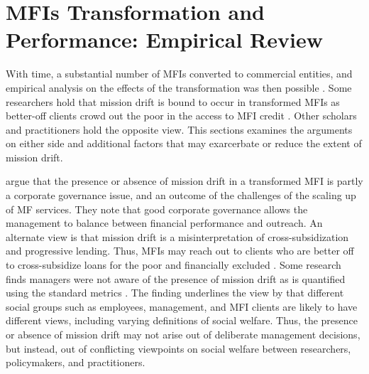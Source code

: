 \documentclass[a4paper, nobind]{templates/ociamthesis}
\begin{document}
\hypertarget{mfis-transformation-and-performance-empirical-review}{%
\section{MFIs Transformation and Performance: Empirical Review}\label{mfis-transformation-and-performance-empirical-review}}

\noindent With time, a substantial number of MFIs converted to commercial entities, and empirical analysis on the effects of the transformation was then possible \autocite{abeysekera2014sustainability,mia2017mission,d2017ngos}. Some researchers hold that mission drift is bound to occur in transformed MFIs as better-off clients crowd out the poor in the access to MFI credit \autocite{hishigsuren2006transformation}. Other scholars and practitioners hold the opposite view. This sections examines the arguments on either side and additional factors that may exarcerbate or reduce the extent of mission drift.

\textcite{campion1999institutional} argue that the presence or absence of mission drift in a transformed MFI is partly a corporate governance issue, and an outcome of the challenges of the scaling up of MF services. They note that good corporate governance allows the management to balance between financial performance and outreach. An alternate view is that mission drift is a misinterpretation of cross-subsidization and progressive lending. Thus, MFIs may reach out to clients who are better off to cross-subsidize loans for the poor and financially excluded \autocite{abeysekera2014sustainability}. Some research finds managers were not aware of the presence of mission drift as is quantified using the standard metrics \autocite{hishigsuren2007evaluating}. The finding underlines the view by \autocite{marti2016financial} that different social groups such as employees, management, and MFI clients are likely to have different views, including varying definitions of social welfare. Thus, the presence or absence of mission drift may not arise out of deliberate management decisions, but instead, out of conflicting viewpoints on social welfare between researchers, policymakers, and practitioners.
\end{document}
